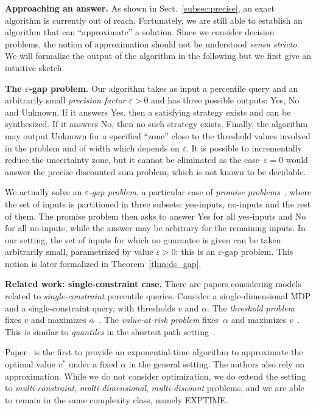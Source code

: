 \documentclass{llncs}
\newcommand\EXPTIME{\textrm{\sf EXPTIME}}
\begin{document}
\smallskip\noindent\textbf{Approaching an answer.} As shown in Sect.~\ref{subsec:precise}, an exact algorithm is currently out of reach. Fortunately, we are still able to establish an algorithm that can ``approximate'' a solution. Since we consider decision problems, the notion of approximation should not be understood \textit{sensu stricto}. We will formalize the output of the algorithm in the following but we first give an intuitive sketch.

\smallskip\noindent\textbf{The $\varepsilon$-gap problem.} Our algorithm takes as input a percentile query and an arbitrarily small \textit{precision factor} $\varepsilon > 0$ and has three possible outputs: \textsf{Yes}, \textsf{No} and \textsf{Unknown}. If it answers \textsf{Yes}, then a satisfying strategy exists and can be synthesized. If it answers \textsf{No}, then no such strategy exists. Finally, the algorithm may output \textsf{Unknown} for a specified ``zone'' close to the threshold values involved in the problem and of width which depends on $\varepsilon$.
It is possible to incrementally reduce the uncertainty zone, but it cannot be eliminated as the case~$\varepsilon=0$ would answer the precise discounted sum problem, which is not known to be decidable.

We actually solve an \emph{$\varepsilon$-gap problem}, a particular case of \emph{promise problems}~\cite{DBLP:conf/birthday/Goldreich06a},
where the set of inputs is partitioned in three subsets: yes-inputs, no-inputs and the rest of them. The promise problem then asks to answer \textsf{Yes} for all yes-inputs and \textsf{No} for all no-inputs, while the answer may be arbitrary for the remaining inputs. 
In our setting, the set of inputs for which no guarantee is given can be taken arbitrarily small, parametrized by value $\varepsilon > 0$: this is an $\varepsilon$-gap problem. This notion is later formalized in Theorem~\ref{thm:ds_gap}.

\smallskip\noindent\textbf{Related work: single-constraint case.} There are papers considering models related to \textit{single-constraint} percentile queries. Consider a single-dimensional MDP and a single-constraint query, with thresholds $v$ and $\alpha$. The \textit{threshold problem} fixes $v$ and maximizes $\alpha$~\cite{White1993634,WL99}. The \textit{value-at-risk problem} fixes~$\alpha$ and maximizes $v$~\cite{DBLP:conf/fsttcs/BrazdilCFNS13}. This is similar to \textit{quantiles} in the shortest path setting~\cite{DBLP:conf/fossacs/UmmelsB13}.

Paper~\cite{DBLP:conf/fsttcs/BrazdilCFNS13} is the first to provide an exponential-time algorithm to approximate the optimal value $v^{\ast}$ under a fixed $\alpha$ in the general setting. The authors also rely on approximation. While we do not consider optimization, we do extend the setting to \textit{multi-constraint}, \textit{multi-dimensional}, \textit{multi-discount} problems, and we are able to remain in the same complexity class, namely \EXPTIME.
\end{document}
